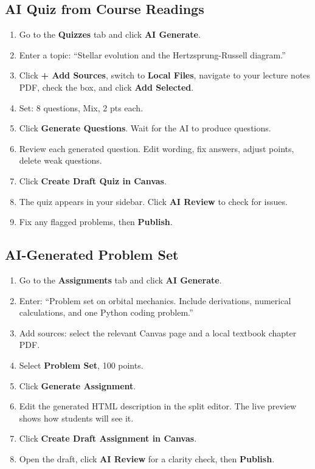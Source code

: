 \documentclass[12pt,letterpaper]{article}
\begin{document}
\subsection{AI Quiz from Course Readings}

\begin{enumerate}[leftmargin=*]
    \item Go to the \textbf{Quizzes} tab and click \textbf{AI Generate}.
    \item Enter a topic: ``Stellar evolution and the Hertzsprung-Russell diagram.''
    \item Click \textbf{+ Add Sources}, switch to \textbf{Local Files}, navigate to your lecture notes PDF, check the box, and click \textbf{Add Selected}.
    \item Set: 8 questions, Mix, 2 pts each.
    \item Click \textbf{Generate Questions}. Wait for the AI to produce questions.
    \item Review each generated question. Edit wording, fix answers, adjust points, delete weak questions.
    \item Click \textbf{Create Draft Quiz in Canvas}.
    \item The quiz appears in your sidebar. Click \textbf{AI Review} to check for issues.
    \item Fix any flagged problems, then \textbf{Publish}.
\end{enumerate}

\subsection{AI-Generated Problem Set}

\begin{enumerate}[leftmargin=*]
    \item Go to the \textbf{Assignments} tab and click \textbf{AI Generate}.
    \item Enter: ``Problem set on orbital mechanics. Include derivations, numerical calculations, and one Python coding problem.''
    \item Add sources: select the relevant Canvas page and a local textbook chapter PDF.
    \item Select \textbf{Problem Set}, 100 points.
    \item Click \textbf{Generate Assignment}.
    \item Edit the generated HTML description in the split editor. The live preview shows how students will see it.
    \item Click \textbf{Create Draft Assignment in Canvas}.
    \item Open the draft, click \textbf{AI Review} for a clarity check, then \textbf{Publish}.
\end{enumerate}
\end{document}

